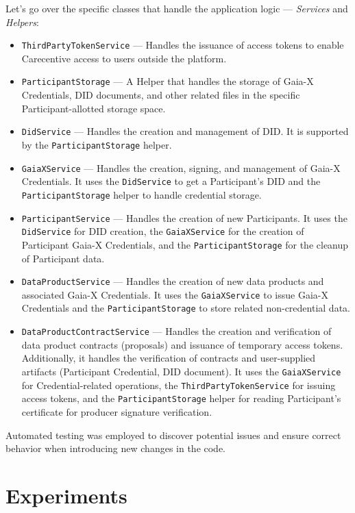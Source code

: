 Let's go over the specific classes that handle the application logic --- \textit{Services} and \textit{Helpers}:
\begin{itemize}
    \item \texttt{ThirdPartyTokenService} --- Handles the issuance of access tokens to enable Carecentive access to users outside the platform.
    \item \texttt{ParticipantStorage} --- A Helper that handles the storage of Gaia-X Credentials, DID documents, and other related files in the specific Participant-allotted storage space.
    \item \texttt{DidService} --- Handles the creation and management of DID.
    It is supported by the \texttt{ParticipantStorage} helper.
    \item \texttt{GaiaXService} --- Handles the creation, signing, and management of Gaia-X Credentials.
    It uses the \texttt{DidService} to get a Participant's DID and the \texttt{ParticipantStorage} helper to handle credential storage.
    \item \texttt{ParticipantService} --- Handles the creation of new Participants.
    It uses the \texttt{DidService} for DID creation, the \texttt{GaiaXService} for the creation of Participant Gaia-X Credentials, and the \texttt{ParticipantStorage} for the cleanup of Participant data.
    \item \texttt{DataProductService} --- Handles the creation of new data products and associated Gaia-X Credentials.
    It uses the \texttt{GaiaXService} to issue Gaia-X Credentials and the \texttt{ParticipantStorage} to store related non-credential data.
    \item \texttt{DataProductContractService} --- Handles the creation and verification of data product contracts (proposals) and issuance of temporary access tokens.
    Additionally, it handles the verification of contracts and user-supplied artifacts (Participant Credential, DID document).
    It uses the \texttt{GaiaXService} for Credential-related operations, the \texttt{ThirdPartyTokenService} for issuing access tokens, and the \texttt{ParticipantStorage} helper for reading Participant's certificate for producer signature verification.
\end{itemize}

Automated testing was employed to discover potential issues and ensure correct behavior when introducing new changes in the code.

\section{Experiments}\label{sec:experiments}

